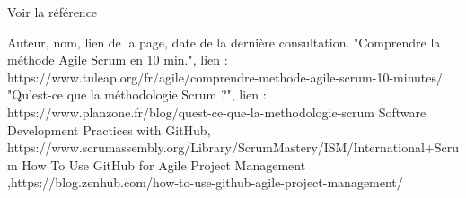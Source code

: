 \documentclass{article}
\begin{document}
Voir la référence \cite{maReference1}
        \begin{thebibliography}{10}
                Auteur, nom, lien de la page, date de la dernière consultation.
                "Comprendre la méthode Agile Scrum en 10 min.", lien : https://www.tuleap.org/fr/agile/comprendre-methode-agile-scrum-10-minutes/
                "Qu'est-ce que la méthodologie Scrum ?", lien : https://www.planzone.fr/blog/quest-ce-que-la-methodologie-scrum
                Software Development Practices with GitHub, https://www.scrumassembly.org/Library/ScrumMastery/ISM/International+Scrum%
                How To Use GitHub for Agile Project Management ,https://blog.zenhub.com/how-to-use-github-agile-project-management/

    \end{thebibliography}
\end{document}
